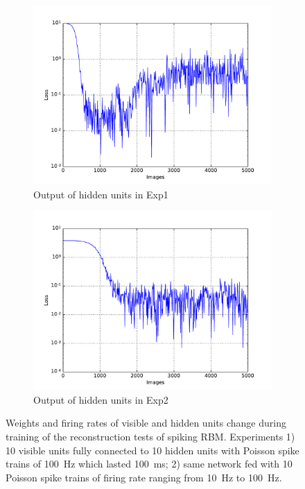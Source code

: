 \begin{figure}
\begin{subfigure}[t]{0.4\textwidth}
		\includegraphics[width=\textwidth]{pics_sdlm/15_exp_SRBM_teach_long/exp1_mse_nons.pdf}
		\caption{Output of hidden units in Exp1}
	\end{subfigure}
	\begin{subfigure}[t]{0.4\textwidth}
		\includegraphics[width=\textwidth]{pics_sdlm/15_exp_SRBM_teach_long/exp2_mse_nons.pdf}
		\caption{Output of hidden units in Exp2}
	\end{subfigure}
	\caption{Weights and firing rates of visible and hidden units change during training of the reconstruction tests of spiking RBM. 
		Experiments 1) 10 visible units fully connected to 10 hidden units with Poisson spike trains of 100~Hz which lasted 100~ms; 2) same network fed with 10 Poisson spike trains of firing rate ranging from 10~Hz to 100~Hz.}
\end{figure}

